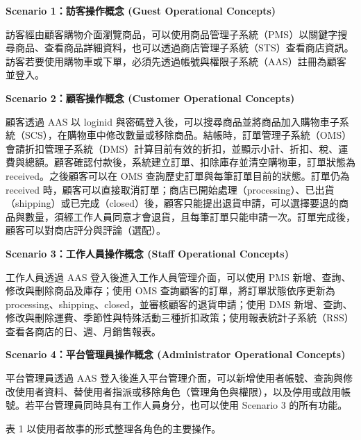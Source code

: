 \documentclass[12pt,a4paper]{article}
\begin{document}
\textbf{Scenario 1：訪客操作概念 (Guest Operational Concepts)}

訪客經由顧客購物介面瀏覽商品，可以使用商品管理子系統（PMS）以關鍵字搜尋商品、查看商品詳細資料，也可以透過商店管理子系統（STS）查看商店資訊。訪客若要使用購物車或下單，必須先透過帳號與權限子系統（AAS）註冊為顧客並登入。

\textbf{Scenario 2：顧客操作概念 (Customer Operational Concepts)}

顧客透過 AAS 以 loginid 與密碼登入後，可以搜尋商品並將商品加入購物車子系統（SCS），在購物車中修改數量或移除商品。結帳時，訂單管理子系統（OMS）會請折扣管理子系統（DMS）計算目前有效的折扣，並顯示小計、折扣、稅、運費與總額。顧客確認付款後，系統建立訂單、扣除庫存並清空購物車，訂單狀態為 received。之後顧客可以在 OMS 查詢歷史訂單與每筆訂單目前的狀態。訂單仍為 received 時，顧客可以直接取消訂單；商店已開始處理（processing）、已出貨（shipping）或已完成（closed）後，顧客只能提出退貨申請，可以選擇要退的商品與數量，須經工作人員同意才會退貨，且每筆訂單只能申請一次。訂單完成後，顧客可以對商店評分與評論（選配）。

\textbf{Scenario 3：工作人員操作概念 (Staff Operational Concepts)}

工作人員透過 AAS 登入後進入工作人員管理介面，可以使用 PMS 新增、查詢、修改與刪除商品及庫存；使用 OMS 查詢顧客的訂單，將訂單狀態依序更新為 processing、shipping、closed，並審核顧客的退貨申請；使用 DMS 新增、查詢、修改與刪除運費、季節性與特殊活動三種折扣政策；使用報表統計子系統（RSS）查看各商店的日、週、月銷售報表。

\textbf{Scenario 4：平台管理員操作概念 (Administrator Operational Concepts)}

平台管理員透過 AAS 登入後進入平台管理介面，可以新增使用者帳號、查詢與修改使用者資料、替使用者指派或移除角色（管理角色與權限），以及停用或啟用帳號。若平台管理員同時具有工作人員身分，也可以使用 Scenario 3 的所有功能。

表 1 以使用者故事的形式整理各角色的主要操作。
\end{document}
